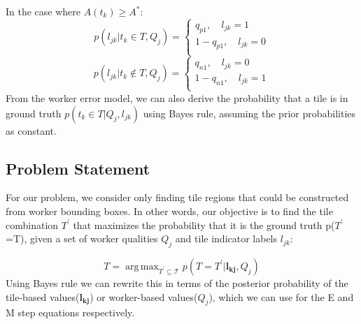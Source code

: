 \documentclass[letterpaper]{article} %
\DeclareMathOperator*{\argmax}{arg\,max}
\begin{document}
\begin{enumerate}
In the case where $A(t_k)\geq A^*$: 
\begin{equation}
p(l_{jk}|t_k\in T,Q_j) = \begin{cases}
               q_{p1}, \quad l_{jk}=1  \\
               1-q_{p1}, \quad l_{jk}=0  \\
            \end{cases}
\end{equation}
\begin{equation}
p(l_{jk}|t_k\notin T,Q_j) = \begin{cases}
               q_{n1}, \quad l_{jk}=0  \\
               1-q_{n1}, \quad l_{jk}=1  \\
            \end{cases}
\end{equation}
From the worker error model, we can also derive the probability that a tile is in ground truth $p(t_k\in T|Q_j, l_{jk})$ using Bayes rule, assuming the prior probabilities as constant.
\end{enumerate}

\subsection{Problem Statement}
\par For our problem, we consider only finding tile regions that could be constructed from worker bounding boxes. In other words, our objective is to find the tile combination $T^\prime$ that maximizes the probability that it is the ground truth p($T^\prime$=T), given a set of worker qualities $Q_j$ and tile indicator labels $l_{jk}$: 

\begin{equation}
T = \argmax_{T^\prime \subseteq \mathcal{T}}p(T=T^\prime |  \mathbf{l_{kj}},Q_j)
\label{objective}
\end{equation}
Using Bayes rule we can rewrite this in terms of the posterior probability of the tile-based values($\mathbf{l_{kj}}$) or worker-based values($Q_{j}$), which we can use for the E and M step equations respectively. 
\end{document}

